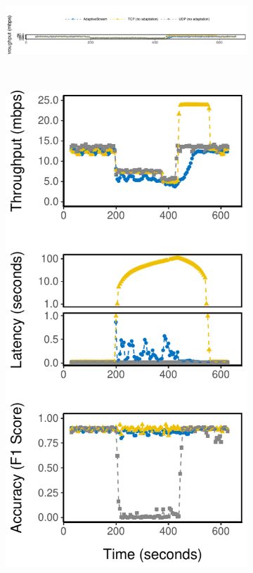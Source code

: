\begin{figure}[!htb]
  \begin{subfigure}[t]{0.7\textwidth}
    \centering
    \includegraphics[width=\textwidth]{figures/runtime-legend.pdf}
  \end{subfigure}
  \\
  \vspace{1em}
  \begin{subfigure}[t]{0.3\textwidth}
    \centering
    \includegraphics[width=\textwidth]{figures/runtime-mot-verticle.pdf}

\end{subfigure}
\end{figure}
